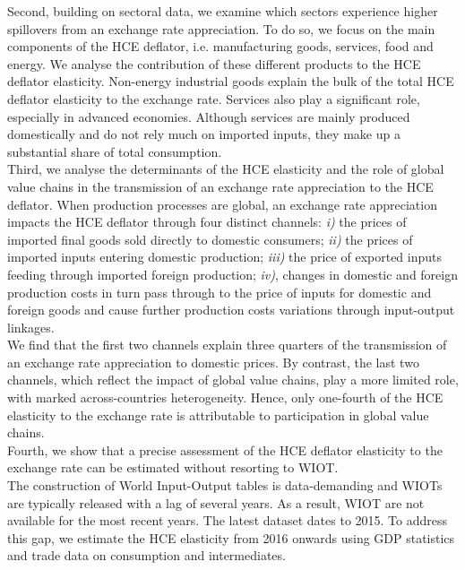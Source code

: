 \documentclass[12pt,a4paper]{article}
\begin{document}
Second, building on sectoral data, we examine which sectors experience higher spillovers from an exchange rate appreciation. 
To do so, we focus on the main components of the HCE deflator, i.e. manufacturing goods, services, food and energy. 
We analyse the contribution of these different products to the HCE deflator elasticity.
Non-energy industrial goods explain the bulk of the total HCE deflator elasticity to the exchange rate. 
Services also play a significant role, especially in advanced economies. 
Although services are mainly produced domestically and do not rely much on imported inputs, they make up a substantial share of total consumption. \\
Third, we analyse the determinants of the HCE elasticity and the role of global value chains in the transmission of an exchange rate appreciation to the HCE deflator. 
When production processes are global, an exchange rate appreciation impacts the HCE deflator through four distinct channels: \textit{i)} the prices of imported ﬁnal goods sold directly to domestic consumers;
\textit{ii)} the prices of imported inputs entering domestic production; 
\textit{iii)} the price of exported inputs feeding through imported foreign production;
\textit{iv)}, changes in domestic and foreign production costs in turn pass through to the price of inputs for domestic and foreign goods and cause further production costs variations through input-output linkages.\\
We find that the first two channels explain three quarters of the transmission of an exchange rate appreciation to domestic prices.
By contrast, the last two channels, which reflect the impact of global value chains, play a more limited role, with marked across-countries heterogeneity.
Hence, only one-fourth of the HCE elasticity to the exchange rate is attributable to participation in global value chains.\\
Fourth, we show that a precise assessment of the HCE deflator elasticity to the exchange rate can be estimated without resorting to WIOT. \\
The construction of World Input-Output tables is data-demanding and WIOTs are typically released with a lag of several years.
As a result, WIOT are not available for the most recent years. The latest dataset dates to 2015. 
To address this gap, we estimate the HCE elasticity from 2016 onwards using GDP statistics and trade data on consumption and intermediates.\\
\end{document}
